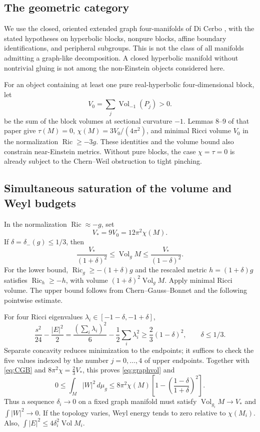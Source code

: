 \documentclass[a4paper,11pt]{article}
\numberwithin{equation}{section}
\theoremstyle{definition}
\newcommand{\Ric}{\operatorname{Ric}}
\newcommand{\Vol}{\operatorname{Vol}}
\newcommand{\dd}{\,d\mu_g}
\begin{document}
\subsection{The geometric category}
We use the closed, oriented extended graph four-manifolds of Di Cerbo \cite{DiCerbo}, with the stated hypotheses on hyperbolic blocks, nonpure blocks, affine boundary identifications, and peripheral subgroups. This is not the class of all manifolds admitting a graph-like decomposition. A closed hyperbolic manifold without nontrivial gluing is not among the non-Einstein objects considered here.

For an object containing at least one pure real-hyperbolic four-dimensional block, let
\[
V_0=\sum_j\Vol_{-1}(P_j)>0.
\]
be the sum of the block volumes at sectional curvature $-1$. Lemmas 8--9 of that paper give $\tau(M)=0$, $\chi(M)=3V_0/(4\pi^2)$, and minimal Ricci volume $V_0$ in the normalization $\Ric\ge-3g$. These identities and the volume bound also constrain near-Einstein metrics. Without pure blocks, the case $\chi=\tau=0$ is already subject to the Chern--Weil obstruction to tight pinching.

\subsection{Simultaneous saturation of the volume and Weyl budgets}
In the normalization $\Ric\approx-g$, set
\[
V_*=9V_0=12\pi^2\chi(M).
\]
If $\delta=\delta_-(g)\le1/3$, then
\begin{equation}\label{eq:graphvol}
\boxed{\frac{V_*}{(1+\delta)^2}\le\Vol_gM
\le\frac{V_*}{(1-\delta)^2}.}
\end{equation}
For the lower bound, $\Ric_g\ge-(1+\delta)g$ and the rescaled metric $h=(1+\delta)g$ satisfies $\Ric_h\ge-h$, with volume $(1+\delta)^2\Vol_gM$. Apply minimal Ricci volume. The upper bound follows from Chern--Gauss--Bonnet and the following pointwise estimate.

For four Ricci eigenvalues $\lambda_i\in[-1-\delta,-1+\delta]$,
\[
\frac{s^2}{24}-\frac{|E|^2}{2}
=\frac{(\sum_i\lambda_i)^2}{6}-\frac12\sum_i\lambda_i^2
\ge\frac23(1-\delta)^2,\qquad\delta\le1/3.
\]
Separate concavity reduces minimization to the endpoints; it suffices to check the five values indexed by the number $j=0,\dots,4$ of upper endpoints. Together with \eqref{eq:CGB} and $8\pi^2\chi=\frac23V_*$, this proves \eqref{eq:graphvol} and
\begin{equation}\label{eq:graphW}
\boxed{0\le\int_M|W|^2\dd\le8\pi^2\chi(M)
\left[1-\left(\frac{1-\delta}{1+\delta}\right)^2\right].}
\end{equation}
Thus a sequence $\delta_i\to0$ on a fixed graph manifold must satisfy $\Vol_{g_i}M\to V_*$ and $\int|W|^2\to0$. If the topology varies, Weyl energy tends to zero relative to $\chi(M_i)$. Also, $\int|E|^2\le4\delta_i^2\Vol M_i$.
\end{document}
